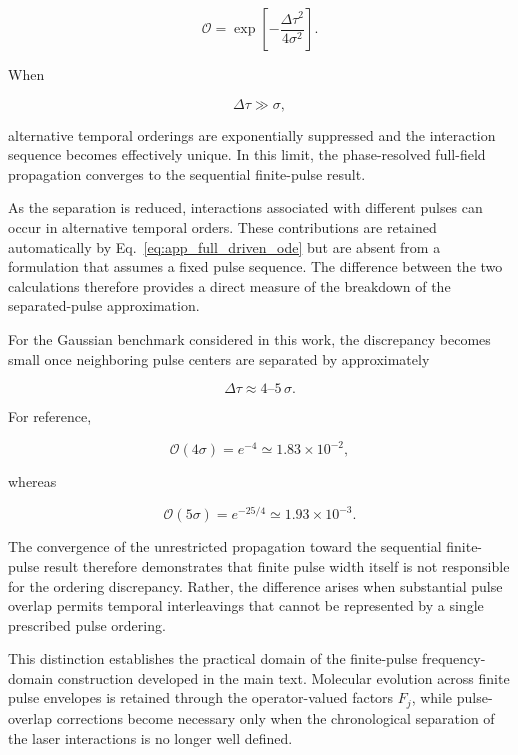 \documentclass[11pt]{article}
\begin{document}
\begin{equation}
\mathcal{O}
=
\exp
\left[
-\frac{\Delta\tau^2}{4\sigma^2}
\right].
\label{eq:app_gaussian_overlap}
\end{equation}

When

\begin{equation}
\Delta\tau
\gg
\sigma,
\end{equation}

alternative temporal orderings are exponentially suppressed and the
interaction sequence becomes effectively unique.  In this limit, the
phase-resolved full-field propagation converges to the sequential
finite-pulse result.

As the separation is reduced, interactions associated with different
pulses can occur in alternative temporal orders.  These contributions
are retained automatically by
Eq.~\eqref{eq:app_full_driven_ode} but are absent from a formulation
that assumes a fixed pulse sequence.  The difference between the two
calculations therefore provides a direct measure of the breakdown of
the separated-pulse approximation.

For the Gaussian benchmark considered in this work, the discrepancy
becomes small once neighboring pulse centers are separated by
approximately

\begin{equation}
\boxed{
\Delta\tau
\approx
4\text{--}5\,\sigma.
}
\end{equation}

For reference,

\begin{equation}
\mathcal{O}(4\sigma)
=
e^{-4}
\simeq
1.83\times10^{-2},
\end{equation}

whereas

\begin{equation}
\mathcal{O}(5\sigma)
=
e^{-25/4}
\simeq
1.93\times10^{-3}.
\end{equation}

The convergence of the unrestricted propagation toward the sequential
finite-pulse result therefore demonstrates that finite pulse width
itself is not responsible for the ordering discrepancy.  Rather, the
difference arises when substantial pulse overlap permits temporal
interleavings that cannot be represented by a single prescribed pulse
ordering.

This distinction establishes the practical domain of the finite-pulse
frequency-domain construction developed in the main text.  Molecular
evolution across finite pulse envelopes is retained through the
operator-valued factors $F_j$, while pulse-overlap corrections become
necessary only when the chronological separation of the laser
interactions is no longer well defined.




\end{document}

